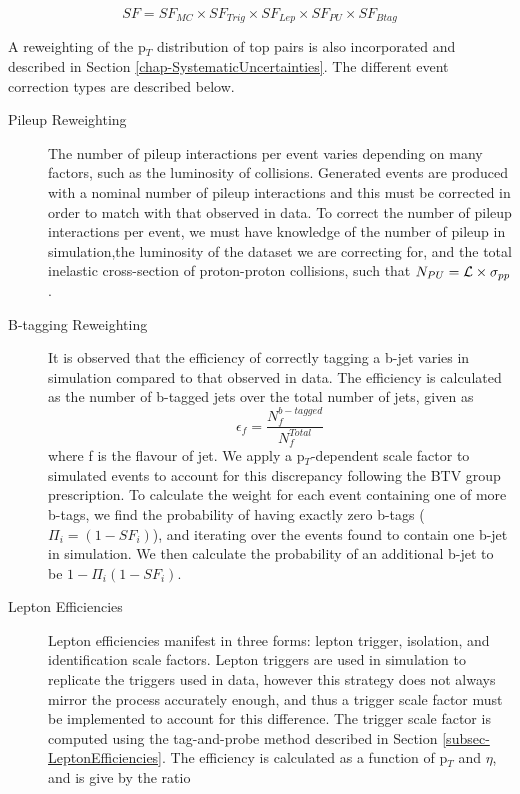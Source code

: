 \begin{equation}
SF = SF_{MC} \times SF_{Trig} \times SF_{Lep} \times SF_{PU} \times SF_{Btag}
\end{equation} \label{eqn-SFProduct}

A reweighting of the p$_T$ distribution of top pairs is also incorporated and described in Section \ref{chap-SystematicUncertainties}. The different event correction types are described below.

\begin{description}
	\item[Pileup Reweighting] The number of pileup interactions per event varies depending on many factors, such as the luminosity of collisions. Generated events are produced with a nominal number of pileup interactions and this must be corrected in order to match with that observed in data. To correct the number of pileup interactions per event, we must have knowledge of the number of pileup in simulation,the luminosity of the dataset we are correcting for, and the total inelastic cross-section of proton-proton collisions, such that $N_{PU} = \mathcal{L} \times \sigma_{pp}$.    
	\item[B-tagging Reweighting] It is observed that the efficiency of correctly tagging a b-jet varies in simulation compared to that observed in data. The efficiency is calculated as the number of b-tagged jets over the total number of jets, given as 
	\begin{equation}
	\epsilon_f = \frac{N_f^{b-tagged}}{N_{f}^{Total}}
	\end{equation}
	where f is the flavour of jet. We apply a p$_T$-dependent scale factor to simulated events to account for this discrepancy \cite{CMS-DP-2013-005} following the BTV group prescription. To calculate the weight for each event containing one of more b-tags, we find the probability of having exactly zero b-tags ($\Pi_i = \left(1 - SF_i\right)$), and iterating over the events found to contain one b-jet in simulation. We then calculate the probability of an additional b-jet to be $1 - \Pi_i\left(1 - SF_i\right)$.  
	\item[Lepton Efficiencies] Lepton efficiencies manifest in three forms: lepton trigger, isolation, and identification scale factors. Lepton triggers are used in simulation to replicate the triggers used in data, however this strategy does not always mirror the process accurately enough, and thus a trigger scale factor must be implemented to account for this difference. The trigger scale factor is computed using the tag-and-probe method \cite{tagandprobe} described in Section \ref{subsec-LeptonEfficiencies}. The efficiency is calculated as a function of p$_T$ and $\eta$, and is give by the ratio

\end{description}

